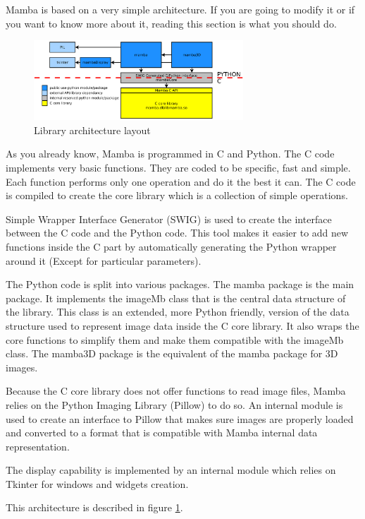 \documentclass[a4paper,10pt,oneside]{article}
\begin{document}
Mamba is based on a very simple architecture. If you are going to modify it or
if you want to know more about it, reading this section is what you should do.

\begin{figure}
\centering
\includegraphics[width=0.7\textwidth]{figures/archi.pdf}
\caption{Library architecture layout}
\label{fig:archi_lay}
\end{figure}

As you already know, Mamba is programmed in C and Python. The C code implements
very basic functions. They are coded to be specific, fast and simple. Each 
function performs only one operation and do it the best it can. The C code is 
compiled to create the core library which is a collection of simple operations.

Simple Wrapper Interface Generator (SWIG) is used to create the interface 
between the C code and the Python code. This tool makes it easier to add new
functions inside the C part by automatically generating the Python wrapper
around it (Except for particular parameters).

The Python code is split into various packages. The mamba package is the 
main package. It implements the imageMb class that is the
central data structure of the library. This class is an extended, more Python
friendly, version of the data structure used to represent image data inside the
C core library. It also wraps the core functions to simplify them
and make them compatible with the imageMb class. The mamba3D package is the
equivalent of the mamba package for 3D images.

Because the C core library does not offer functions to read image files, Mamba
relies on the Python Imaging Library (Pillow) to do so. An internal module is used
to create an interface to Pillow that makes sure images are properly loaded and
converted to a format that is compatible with Mamba internal data representation.

The display capability is implemented by an internal module which relies on
Tkinter for windows and widgets creation.

This architecture is described in figure \ref{fig:archi_lay}.
\end{document}
